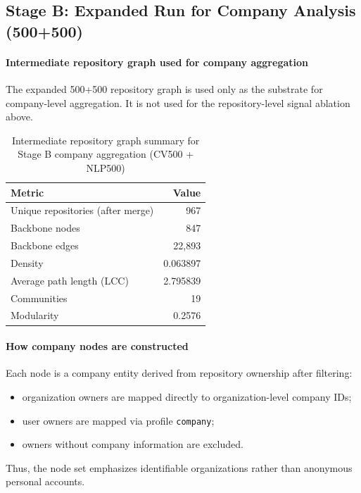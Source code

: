 \documentclass[11pt]{article}
\begin{document}
\subsection{Stage B: Expanded Run for Company Analysis (500+500)}
\paragraph{Intermediate repository graph used for company aggregation}
The expanded 500+500 repository graph is used only as the substrate for company-level aggregation.
It is not used for the repository-level signal ablation above.
\begin{table}[h]
\centering
\caption{Intermediate repository graph summary for Stage B company aggregation (CV500 + NLP500)}
\begin{tabular}{lr}
\toprule
Metric & Value \\
\midrule
Unique repositories (after merge) & 967 \\
Backbone nodes & 847 \\
Backbone edges & 22,893 \\
Density & 0.063897 \\
Average path length (LCC) & 2.795839 \\
Communities & 19 \\
Modularity & 0.2576 \\
\bottomrule
\end{tabular}
\label{tab:repo-summary}
\end{table}

\paragraph{How company nodes are constructed}
Each node is a company entity derived from repository ownership after filtering:
\begin{itemize}[leftmargin=1.5em]
    \item organization owners are mapped directly to organization-level company IDs;
    \item user owners are mapped via profile \texttt{company};
    \item owners without company information are excluded.
\end{itemize}
Thus, the node set emphasizes identifiable organizations rather than anonymous personal accounts.
\end{document}

